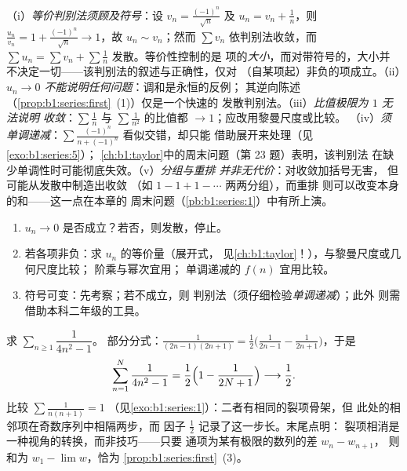 \begin{remark}[级数的常见误区]
（i）\emph{等价判别法须顾及符号}：设 $v_n =
\frac{(-1)^n}{\sqrt n}$ 及 $u_n = v_n + \frac1n$，则
$\frac{u_n}{v_n} = 1 + \frac{(-1)^n}{\sqrt n} \to 1$，故 $u_n
\sim v_n$；然而 $\sum v_n$ 依判别法收敛，而
$\sum u_n = \sum v_n + \sum \frac1n$ 发散。等价性控制的是
项的\emph{大小}，而对带符号的，大小并
不决定一切——该判别法的叙述与正确性，仅对
（自某项起）非负的项成立。（ii）\emph{$u_n \to 0$
不能说明任何问题}：调和是永恒的反例；
其逆向陈述
（\cref{prop:b1:series:first}~(1)）仅是一个快速的
发散判别法。（iii）\emph{比值极限为 $1$ 无法说明
收敛}：$\sum\frac1n$ 与 $\sum\frac{1}{n^2}$ 的比值都
$\to 1$；应改用黎曼尺度或比较。
（iv）\emph{须单调递减}：$\sum
\frac{(-1)^n}{n + (-1)^n}$ 看似交错，却只能
借助展开来处理（见\cref{exo:b1:series:5}）；
\cref{ch:b1:taylor}中的周末问题（第 23 题）表明，该判别法
在缺少单调性时可能彻底失效。（v）\emph{分组与重排
并非无代价}：对收敛加括号无害，
但可能从发散中制造出收敛
（如 $1 - 1 + 1 - \cdots$ 两两分组），而重排
则可以改变本身的和——这一点在本章的
周末问题（\cref{pb:b1:series:1}）中有所上演。
\end{remark}

\begin{method}[判定级数的敛散性]\label{met:b1:series:decide}
\begin{enumerate}
  \item $u_n \to 0$ 是否成立？若否，则发散，停止。
  \item 若各项非负：求 $u_n$ 的等价量（展开式，
        见\cref{ch:b1:taylor}！），与黎曼尺度或几何尺度比较；
        阶乘与幂次宜用；
        单调递减的 $f(n)$ 宜用比较。
  \item 符号可变：先考察；若不成立，则
        判别法（须仔细检验\emph{单调递减}）；此外
        则需借助本科二年级的工具。
\end{enumerate}
\end{method}

\begin{example}\label{ex:b1:series:oddtelescope}
求 $\sum_{n \geq 1} \dfrac{1}{4n^2 - 1}$。
部分分式：$\frac{1}{(2n-1)(2n+1)} =
\frac12\bigl(\frac{1}{2n-1} - \frac{1}{2n+1}\bigr)$，于是
\[
\sum_{n=1}^{N} \frac{1}{4n^2 - 1}
= \frac12\Bigl(1 - \frac{1}{2N+1}\Bigr)
\longrightarrow \frac12 .
\]
比较 $\sum \frac{1}{n(n+1)} = 1$
（见\cref{exo:b1:series:1}）：二者有相同的裂项骨架，但
此处的相邻项在奇数序列中相隔两步，而
因子 $\frac12$ 记录了这一步长。末尾点明：
裂项相消是一种视角的转换，而非技巧——只要
通项为某有极限的数列的差 $w_n - w_{n+1}$，
则和为 $w_1 - \lim w$，恰为
\cref{prop:b1:series:first}~(3)。
\end{example}

